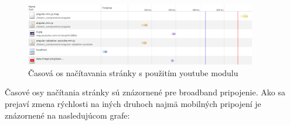 \begin{figure}[H]
  \centering
  \includegraphics[width=0.9\textwidth]{img/load/timeline-y-a.png}
  \caption[Časová os načítavania stránky s použitím youtube modulu]{
    Časová os načítavania stránky s použitím youtube modulu}
  \label{fig: timeline-y-a}
\end{figure}

Časové osy načítania stránky sú znázornené pre broadband pripojenie. Ako sa prejaví zmena rýchlosti na iných druhoch najmä mobilných pripojení je znázornené na nasledujúcom grafe:

